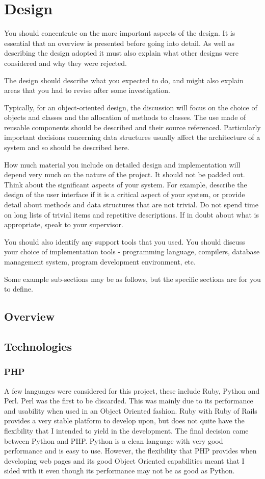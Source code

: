 \chapter{Design}

You should concentrate on the more important aspects of the design. It is essential that an overview is presented before going into detail. As well as describing the design adopted it must also explain what other designs were considered and why they were rejected.

The design should describe what you expected to do, and might also explain areas that you had to revise after some investigation.

Typically, for an object-oriented design, the discussion will focus on the choice of objects and classes and the allocation of methods to classes. The use made of reusable components should be described and their source referenced. Particularly important decisions concerning data structures usually affect the architecture of a system and so should be described here.

How much material you include on detailed design and implementation will depend very much on the nature of the project. It should not be padded out. Think about the significant aspects of your system. For example, describe the design of the user interface if it is a critical aspect of your system, or provide detail about methods and data structures that are not trivial. Do not spend time on long lists of trivial items and repetitive descriptions. If in doubt about what is appropriate, speak to your supervisor.
 
You should also identify any support tools that you used. You should discuss your choice of implementation tools - programming language, compilers, database management system, program development environment, etc.

Some example sub-sections may be as follows, but the specific sections are for you to define. 

\section{Overview}
\section{Technologies}
	\subsection{PHP}
		A few languages were considered for this project, these include Ruby, Python and Perl. Perl was the first to be discarded. This was mainly due to its performance and usability when used in an Object Oriented fashion. Ruby with Ruby of Rails provides a very stable platform to develop upon, but does not quite have the flexibility that I intended to yield in the development. The final decision came between Python and PHP. Python is a clean language with very good performance and is easy to use. However, the flexibility that PHP provides when developing web pages and its good Object Oriented capabilities meant that I sided with it even though its performance may not be as good as Python.
		
